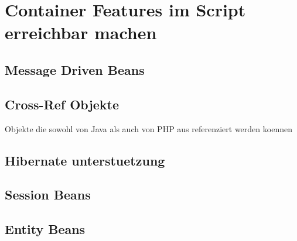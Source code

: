 \chapter{Container Features im Script erreichbar machen}
\label{sec:chap3}


\section{Message Driven Beans}
\label{sec:chap3:mdb}

\section{Cross-Ref Objekte}
\label{sec:chap3:xref}
Objekte die sowohl von Java als auch von PHP aus
        referenziert werden koennen


\section{Hibernate unterstuetzung}
\label{sec:chap3:hib}

\section{Session Beans}
\label{sec:chap3:sb}

\section{Entity Beans}
\label{sec:chap3:eb}




